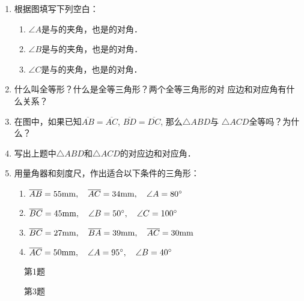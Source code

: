 \begin{ex}
\begin{enumerate}
	\item 根据图填写下列空白：
\begin{enumerate}
	\item $\angle A$是\underline{\qquad }与\underline{\qquad }的夹角，也是\underline{\qquad }的对角．
	\item $\angle B$是\underline{\qquad }与\underline{\qquad }的夹角，也是\underline{\qquad }的对角．
	\item $\angle C$是\underline{\qquad }与\underline{\qquad }的夹角，也是\underline{\qquad }的对角．
\end{enumerate}

	\item 什么叫全等形？什么是全等三角形？两个全等三角形的对
	应边和对应角有什么关系？
	\item 在图中，如果已知$\overline{AB}=\overline{AC}$, $\overline{BD}=\overline{DC}$, 那么$\triangle ABD$与
	$\triangle ACD$全等吗？为什么？

\item 写出上题中$\triangle ABD$和$\triangle ACD$的对应边和对应角．
\item 用量角器和刻度尺，作出适合以下条件的三角形：
\begin{enumerate}
	\item $\overline{AB}=55{\rm mm},\quad \overline{AC}=34{\rm mm},\quad \angle A=80^{\circ}$
\item $\overline{BC}=45{\rm mm},\quad \angle B=50^{\circ},\quad \angle C=100^{\circ}$
\item $\overline{BC}=27{\rm mm},\quad \overline{BA}=39{\rm mm},\quad \overline{AC}=30{\rm mm}$
\item $\overline{AC}=50{\rm mm},\quad \angle A=95^{\circ},\quad \angle B=40^{\circ}$
\end{enumerate}
\end{enumerate}
\end{ex}

\begin{figure}[htp]\centering
    \begin{minipage}[t]{0.48\textwidth}
    \centering
{}
    \caption*{第1题}
    \end{minipage}
    \begin{minipage}[t]{0.48\textwidth}
    \centering
    \caption*{第3题}
    \end{minipage}
    \end{figure}

